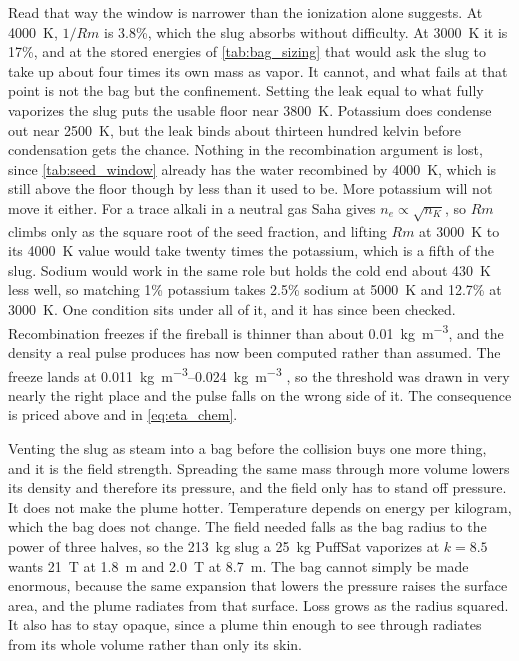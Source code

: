 \documentclass{article}
\begin{document}
Read that way the window is narrower than the ionization alone suggests. At \SI{4000}{\kelvin}, $1/Rm$ is 3.8\%, which the slug absorbs without difficulty. At \SI{3000}{\kelvin} it is 17\%, and at the stored energies of \autoref{tab:bag_sizing} that would ask the slug to take up about four times its own mass as vapor. It cannot, and what fails at that point is not the bag but the confinement. Setting the leak equal to what fully vaporizes the slug puts the usable floor near \SI{3800}{\kelvin}. Potassium does condense out near \SI{2500}{\kelvin}, but the leak binds about thirteen hundred kelvin before condensation gets the chance. Nothing in the recombination argument is lost, since \autoref{tab:seed_window} already has the water recombined by \SI{4000}{\kelvin}, which is still above the floor though by less than it used to be. More potassium will not move it either. For a trace alkali in a neutral gas Saha gives $n_e \propto \sqrt{n_K}$, so $Rm$ climbs only as the square root of the seed fraction, and lifting $Rm$ at \SI{3000}{\kelvin} to its \SI{4000}{\kelvin} value would take twenty times the potassium, which is a fifth of the slug. Sodium would work in the same role but holds the cold end about \SI{430}{\kelvin} less well, so matching 1\% potassium takes 2.5\% sodium at \SI{5000}{\kelvin} and 12.7\% at \SI{3000}{\kelvin}. One condition sits under all of it, and it has since been checked. Recombination freezes if the fireball is thinner than about \SI{0.01}{\kilogram\per\cubic\meter}, and the density a real pulse produces has now been computed rather than assumed. The freeze lands at \SIrange{0.011}{0.024}{\kilogram\per\cubic\meter} \cite{Katz_puffsat_impact_sim_2026}, so the threshold was drawn in very nearly the right place and the pulse falls on the wrong side of it. The consequence is priced above and in \autoref{eq:eta_chem}.

Venting the slug as steam into a bag before the collision buys one more thing, and it is the field strength. Spreading the same mass through more volume lowers its density and therefore its pressure, and the field only has to stand off pressure. It does not make the plume hotter. Temperature depends on energy per kilogram, which the bag does not change. The field needed falls as the bag radius to the power of three halves, so the \SI{213}{\kilogram} slug a \SI{25}{\kilogram} PuffSat vaporizes at $k = 8.5$ wants \SI{21}{\tesla} at \SI{1.8}{\meter} and \SI{2.0}{\tesla} at \SI{8.7}{\meter}. The bag cannot simply be made enormous, because the same expansion that lowers the pressure raises the surface area, and the plume radiates from that surface. Loss grows as the radius squared. It also has to stay opaque, since a plume thin enough to see through radiates from its whole volume rather than only its skin.
\end{document}
